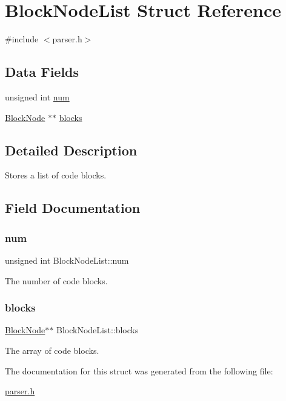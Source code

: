\hypertarget{struct_block_node_list}{}\section{Block\+Node\+List Struct Reference}
\label{struct_block_node_list}


{\ttfamily \#include $<$parser.\+h$>$}

\subsection*{Data Fields}
\begin{DoxyCompactItemize}
\item 
unsigned int \hyperlink{struct_block_node_list_af36c77e76b73f0fa500ada63aaad2dd7}{num}
\item 
\hyperlink{struct_block_node}{Block\+Node} $\ast$$\ast$ \hyperlink{struct_block_node_list_a97ab8b891f65c2f8152712d59f69be64}{blocks}
\end{DoxyCompactItemize}


\subsection{Detailed Description}
Stores a list of code blocks. 

\subsection{Field Documentation}
\mbox{\label{struct_block_node_list_af36c77e76b73f0fa500ada63aaad2dd7}} 
\subsubsection{\texorpdfstring{num}{num}}
{\footnotesize\ttfamily unsigned int Block\+Node\+List\+::num}

The number of code blocks. \mbox{\label{struct_block_node_list_a97ab8b891f65c2f8152712d59f69be64}} 
\subsubsection{\texorpdfstring{blocks}{blocks}}
{\footnotesize\ttfamily \hyperlink{struct_block_node}{Block\+Node}$\ast$$\ast$ Block\+Node\+List\+::blocks}

The array of code blocks. 

The documentation for this struct was generated from the following file\+:\begin{DoxyCompactItemize}
\item 
\hyperlink{parser_8h}{parser.\+h}\end{DoxyCompactItemize}
